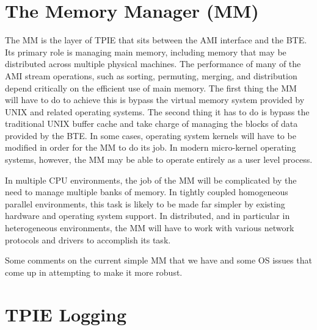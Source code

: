 \section{The Memory Manager (MM)}
\label{sec:ref-mm}

The MM is the layer of TPIE that sits between the AMI interface and the
BTE.  Its primary role is managing main memory, including memory that
may be distributed across multiple physical machines.  The performance
of many of the AMI stream operations, such as sorting, permuting,
merging, and distribution depend critically on the efficient use of
main memory.  The first thing the MM will have to do to achieve this
is bypass the virtual memory system provided by UNIX and related
operating systems.  The second thing it has to do is bypass the
traditional UNIX buffer cache and take charge of managing the blocks
of data provided by the BTE.  In some cases, operating system kernels
will have to be modified in order for the MM to do its job.  In modern
micro-kernel operating systems, however, the MM may be able to operate
entirely as a user level process.

In multiple CPU environments, the job of the MM will be complicated by
the need to manage multiple banks of memory.  In tightly coupled
homogeneous parallel environments, this task is likely to be made far
simpler by existing hardware and operating system support.  In
distributed, and in particular in heterogeneous environments, the MM
will have to work with various network protocols and drivers to
accomplish its task.

Some comments on the current simple MM that we have and some OS issues
that come up in attempting to make it more robust.

\section{TPIE Logging}
\label{sec:logging}

